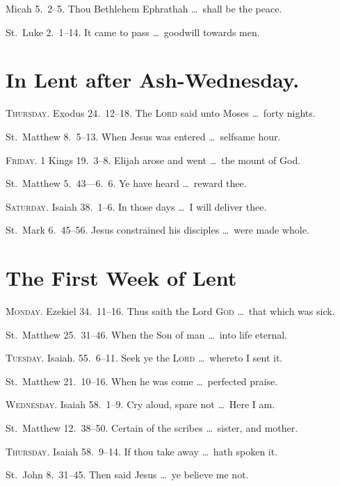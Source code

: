  Micah 5.~2–5. Thou Bethlehem Ephrathah \ldots\ shall be the peace.

 St.~Luke 2.~1–14. It came to pass \ldots\ goodwill towards men.


\section{In Lent {\normalfont after Ash-Wednesday.}}

{\scshape Thursday.}  Exodus 24.~12–18.   The {\scshape Lord} said unto Moses \ldots\ forty nights.

 St.~Matthew 8.~5–13.   When Jesus was entered \ldots\ selfsame hour.

{\scshape Friday.}  1 Kings 19.~3–8.   Elijah arose and went \ldots\ the mount of God.

 St.~Matthew 5.~43—6.~6.   Ye have heard \ldots\ reward thee.

{\scshape Saturday.}  Isaiah 38.~1–6.   In those days \ldots\ I will deliver thee.

 St.~Mark 6.~45–56.   Jesus constrained his disciples \ldots\ were made whole.

\section{The First Week of Lent}

{\scshape Monday.}  Ezekiel 34.~11–16.   Thus saith the Lord {\scshape God} \ldots\ that which was sick.

 St.~Matthew 25.~31–46.   When the Son of man \ldots\ into life eternal.

{\scshape Tuesday.}  Isaiah. 55.~6–11.   Seek ye the {\scshape Lord} \ldots\ whereto I sent it.

 St.~Matthew 21.~10–16.   When he was come \ldots\ perfected praise.

{\scshape Wednesday.}  Isaiah 58.~1–9.   Cry aloud, spare not \ldots\ Here I am.

 St.~Matthew 12.~38–50.   Certain of the scribes \ldots\ sister, and mother.

{\scshape Thursday.}  Isaiah 58.~9–14.   If thou take away \ldots\ hath spoken it.

 St.~John 8.~31–45.   Then said Jesus \ldots\ ye believe me not.

